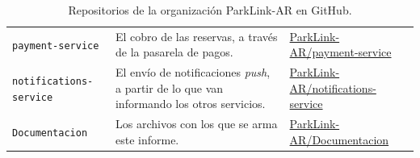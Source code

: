 \begin{table}[H]
\begin{tabularx}{\textwidth}{@{}l X l@{}}
\texttt{payment-service} & El cobro de las reservas, a través de la pasarela de pagos. & \href{https://github.com/ParkLink-AR/payment-service}{ParkLink-AR/payment-service} \\
\texttt{notifications-service} & El envío de notificaciones \textit{push}, a partir de lo que van informando los otros servicios. & \href{https://github.com/ParkLink-AR/notifications-service}{ParkLink-AR/notifications-service} \\
\texttt{Documentacion} & Los archivos con los que se arma este informe. & \href{https://github.com/ParkLink-AR/Documentacion}{ParkLink-AR/Documentacion} \\
\bottomrule
\end{tabularx}
\caption{Repositorios de la organización ParkLink-AR en GitHub.}
\label{tab:repositorios}
\end{table}
